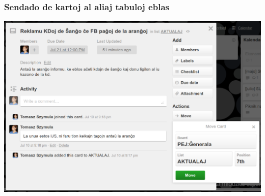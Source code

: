   \begin{frame}
    \frametitle{Sendado de kartoj al aliaj tabuloj eblas}
	
	\begin{center}
		\includegraphics[scale=0.2]{ekranoj/movu-karton}
	\end{center}
	
  \end{frame}


